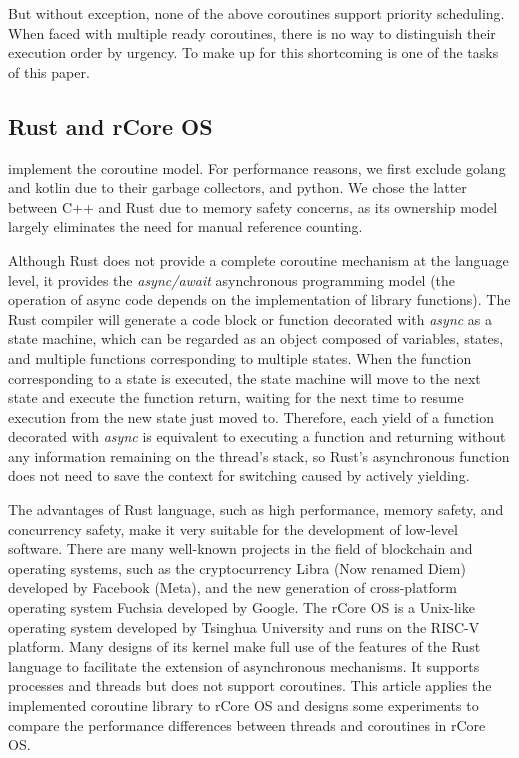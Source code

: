 \documentclass[10pt]{article}
\begin{document}
But without exception, none of the above coroutines support priority scheduling. When faced with multiple ready coroutines, there is no way to distinguish their execution order by urgency. To make up for this shortcoming is one of the tasks of this paper.

\subsection{Rust and rCore OS}

implement the coroutine model. For performance reasons, we first exclude golang and kotlin due to their garbage collectors, and python. We chose the latter between C++ and Rust due to memory safety concerns, as its ownership model largely eliminates the need for manual reference counting. 

Although Rust does not provide a complete coroutine mechanism at the language level, it provides the \textit{async/await} asynchronous programming model \cite{cutner2021safe} (the operation of async code depends on the implementation of library functions). The Rust compiler will generate a code block or function decorated with \textit{async} as a state machine, which can be regarded as an object composed of variables, states, and multiple functions corresponding to multiple states. When the function corresponding to a state is executed, the state machine will move to the next state and execute the function return, waiting for the next time to resume execution from the new state just moved to. Therefore, each yield of a function decorated with \textit{async} is equivalent to executing a function and returning without any information remaining on the thread's stack, so Rust's asynchronous function does not need to save the context for switching caused by actively yielding.

The advantages of Rust language, such as high performance, memory safety, and concurrency safety, make it very suitable for the development of low-level software. There are many well-known projects in the field of blockchain and operating systems, such as the cryptocurrency Libra (Now renamed Diem) developed by Facebook (Meta), and the new generation of cross-platform operating system Fuchsia developed by Google. The rCore OS is a Unix-like operating system developed by Tsinghua University and runs on the RISC-V platform. Many designs of its kernel make full use of the features of the Rust language to facilitate the extension of asynchronous mechanisms. It supports processes and threads but does not support coroutines. This article applies the implemented coroutine library to rCore OS and designs some experiments to compare the performance differences between threads and coroutines in rCore OS.
\end{document}
